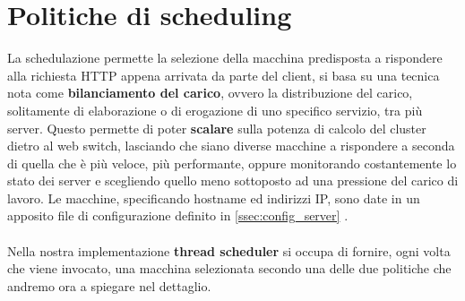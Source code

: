 \documentclass[italian]{tktltiki2}
\begin{document}
\section{Politiche di scheduling}
 \label{sec: sched_p}
La schedulazione permette la selezione della macchina predisposta a rispondere alla richiesta HTTP appena arrivata da parte del client, si basa su una tecnica nota come \textbf{bilanciamento del carico}, ovvero la distribuzione del carico, solitamente di elaborazione o di erogazione di uno specifico servizio, tra più server. Questo permette di poter \textbf{scalare} sulla potenza di calcolo del cluster dietro al web switch, lasciando che siano diverse macchine a rispondere a seconda di quella che è più veloce, più performante, oppure monitorando costantemente lo stato dei server e scegliendo quello meno sottoposto ad una pressione del carico di lavoro. Le macchine, specificando hostname ed indirizzi IP, sono date in un apposito file di configurazione definito in \ref{ssec:config_server} .
\\
\\
Nella nostra implementazione \textbf{thread scheduler} si occupa di fornire,  ogni volta che viene invocato, una macchina selezionata secondo una delle due politiche che andremo ora a spiegare nel dettaglio.
\end{document}
